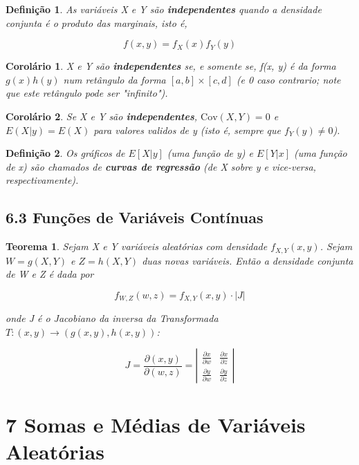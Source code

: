 \documentclass[12pt]{article}
\newtheorem{theorem}{Teorema}[section]
\newtheorem{corollary}{Corolário}[theorem]
\newtheorem{definition}{Definição}
\begin{document}
\begin{definition}
    As variáveis X e Y são \textbf{independentes} quando a densidade conjunta é o produto das marginais, isto é,
    
    $$f(x, y) = f_X (x) f_Y (y)$$
\end{definition}

\begin{corollary}
    X e Y são \textbf{independentes} se, e somente se, f(x, y) é da forma $g(x) h(y)$ num retângulo da forma $[a, b] \times [c, d]$ (e 0 caso contrario; note que este retângulo pode ser "infinito").
\end{corollary}

\begin{corollary}
    Se X e Y são \textbf{independentes}, $\text{Cov} (X, Y) = 0$ e $E(X | y) = E(X)$ para valores validos de y (isto é, sempre que $f_Y (y) \neq 0$).
\end{corollary}

\begin{definition}
    Os gráficos de $E[X|y]$ (uma função de y) e $E[Y|x]$ (uma função de x) são chamados de \textbf{curvas de regressão} (de X sobre y e vice-versa, respectivamente).
\end{definition}

\subsection*{6.3 Funções de Variáveis Contínuas}
\label{s29}

\begin{theorem}
    Sejam X e Y variáveis aleatórias com densidade $f_{X, Y} (x, y)$. Sejam $W = g(X, Y)$ e $Z = h(X, Y)$ duas novas variáveis. Então a densidade conjunta de W e Z é dada por
    
    $$f_{W,Z} (w, z) = f_{X, Y} (x, y) \cdot |J|$$
    
    onde J é o Jacobiano da inversa da Transformada $T : (x, y) \rightarrow{} (g(x, y), h(x, y))$:
    
    $$J = \frac{\partial (x,y)}{\partial (w, z)} = \left | \begin{array}{cc}
        \frac{\partial x}{\partial w} & \frac{\partial x}{\partial z} \\
        \frac{\partial y}{\partial w} & \frac{\partial y}{\partial z}
    \end{array} \right |$$
\end{theorem}

\section*{7 Somas e Médias de Variáveis Aleatórias}
\label{s30}
\end{document}
